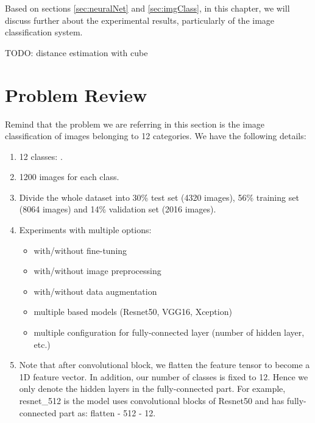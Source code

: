 \label{chap:ExpRes}
Based on sections \ref{sec:neuralNet} and \ref{sec:imgClass}, in this chapter, we will discuss further about the experimental results, particularly of the image classification system.


TODO: distance estimation with cube

\section{Problem Review}
Remind that the problem we are referring in this section is the image classification of images belonging to 12 categories. We have the following details:
\begin{enumerate}
	\item 12 classes: .
	\item 1200 images for each class.
	\item Divide the whole dataset into 30\% test set (4320 images), 56\% training set (8064 images) and 14\% validation set (2016 images).
	\item Experiments with multiple options: 
	\begin{itemize}
		\item with/without fine-tuning
		\item with/without image preprocessing
		\item with/without data augmentation
		\item multiple based models (Resnet50, VGG16, Xception)
		\item multiple configuration for fully-connected layer (number of hidden layer, etc.)
	\end{itemize} 
	\item Note that after convolutional block, we flatten the feature tensor to become a 1D feature vector. In addition, our number of classes is fixed to 12. Hence we only denote the hidden layers in the fully-connected part. For example, resnet\_512 is the model uses convolutional blocks of Resnet50 and has fully-connected part as: flatten - 512 - 12. 
\end{enumerate}


